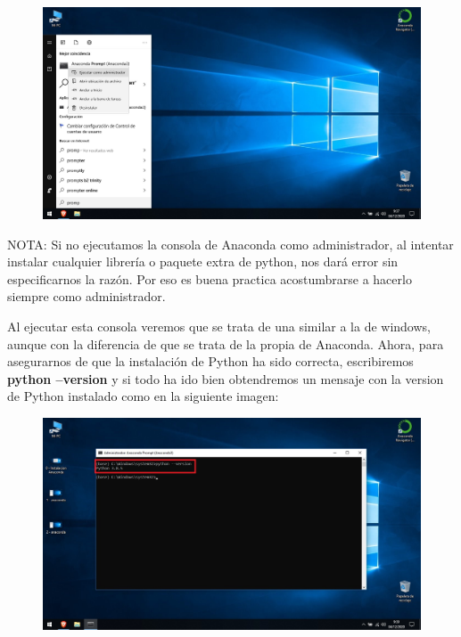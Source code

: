 \documentclass[a4paper,10pt]{article}
\begin{document}
\begin{figure}[H]
\begin{center}
\includegraphics[width=450pt]{./fotos/introduccion/2 - anaconda.jpg}
\end{center}
\end{figure}

NOTA: Si no ejecutamos la consola de Anaconda como administrador, al intentar instalar cualquier librería o paquete extra de python, nos dará error sin especificarnos la razón. Por eso es buena practica acostumbrarse a hacerlo siempre como administrador.

Al ejecutar esta consola veremos que se trata de una similar a la de windows, aunque con la diferencia de que se trata de la propia de Anaconda. Ahora, para asegurarnos de que la instalación de Python ha sido correcta, escribiremos \textbf{python --version}
y si todo ha ido bien obtendremos un mensaje con la version de Python instalado como en la siguiente imagen: 

\begin{figure}[H]
\begin{center}
\includegraphics[width=450pt]{./fotos/introduccion/3 - anaconda (V).jpg}
\end{center}
\end{figure}
\end{document}
